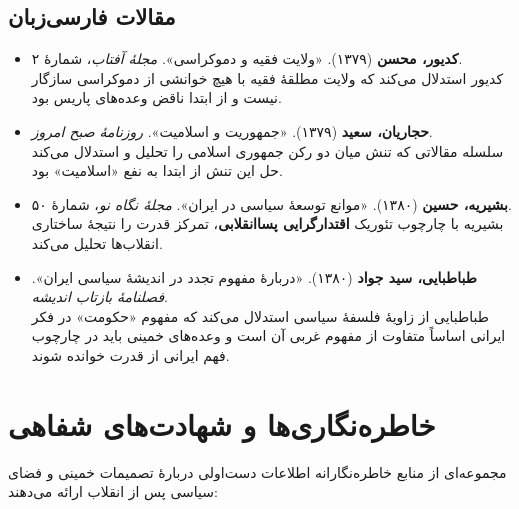 \documentclass[12pt,a4paper]{book}
\newcommand{\keyword}[1]{\textbf{\textcolor{cPrimary}{#1}}}
\begin{document}
\subsection{مقالات فارسی‌زبان}

\begin{itemize}[label=\textcolor{cGold}{$\blacktriangleright$}, rightmargin=2em]
    \item \textbf{کدیور، محسن} (۱۳۷۹). «ولایت فقیه و دموکراسی». \textit{مجلهٔ آفتاب}، شمارهٔ ۲.\\
    کدیور استدلال می‌کند که ولایت مطلقهٔ فقیه با هیچ‌ خوانشی از دموکراسی سازگار نیست و از ابتدا ناقض وعده‌های پاریس بود.

    \item \textbf{حجاریان، سعید} (۱۳۷۹). «جمهوریت و اسلامیت». \textit{روزنامهٔ صبح امروز}.\\
    سلسله مقالاتی که تنش میان دو رکن جمهوری اسلامی را تحلیل و استدلال می‌کند حل این تنش از ابتدا به نفع «اسلامیت» بود.

    \item \textbf{بشیریه، حسین} (۱۳۸۰). «موانع توسعهٔ سیاسی در ایران». \textit{مجلهٔ نگاه نو}، شمارهٔ ۵۰.\\
    بشیریه با چارچوب تئوریک \keyword{اقتدارگرایی پساانقلابی}، تمرکز قدرت را نتیجهٔ ساختاری انقلاب‌ها تحلیل می‌کند.

    \item \textbf{طباطبایی، سید جواد} (۱۳۸۰). «دربارهٔ مفهوم تجدد در اندیشهٔ سیاسی ایران». \textit{فصلنامهٔ بازتاب اندیشه}.\\
    طباطبایی از زاویهٔ فلسفهٔ سیاسی استدلال می‌کند که مفهوم «حکومت» در فکر ایرانی اساساً متفاوت از مفهوم غربی آن است و وعده‌های خمینی باید در چارچوب فهم ایرانی از قدرت خوانده شوند.
\end{itemize}

\section{خاطره‌نگاری‌ها و شهادت‌های شفاهی}

مجموعه‌ای از منابع خاطره‌نگارانه اطلاعات دست‌اولی دربارهٔ تصمیمات خمینی و فضای سیاسی پس از انقلاب ارائه می‌دهند:
\end{document}
